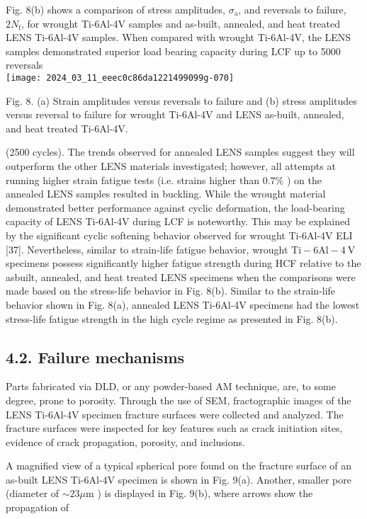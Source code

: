 \documentclass[10pt]{article}
\begin{document}
Fig. 8(b) shows a comparison of stress amplitudes, $\sigma_{\mathrm{a}}$, and reversals to failure, $2 N_{\mathrm{f}}$, for wrought Ti-6Al-4V samples and as-built, annealed, and heat treated LENS Ti-6Al-4V samples. When compared with wrought Ti-6Al-4V, the LENS samples demonstrated superior load bearing capacity during LCF up to 5000 reversals\\
\texttt{[image: 2024\_03\_11\_eeec0c86da1221499099g-070]}

Fig. 8. (a) Strain amplitudes versus reversals to failure and (b) stress amplitudes versus reversal to failure for wrought Ti-6Al-4V and LENS as-built, annealed, and heat treated Ti-6Al-4V.

(2500 cycles). The trends observed for annealed LENS samples suggest they will outperform the other LENS materials investigated; however, all attempts at running higher strain fatigue tests (i.e. strains higher than $0.7 \%$ ) on the annealed LENS samples resulted in buckling. While the wrought material demonstrated better performance against cyclic deformation, the load-bearing capacity of LENS Ti-6Al-4V during LCF is noteworthy. This may be explained by the significant cyclic softening behavior observed for wrought Ti-6Al-4V ELI [37]. Nevertheless, similar to strain-life fatigue behavior, wrought $\mathrm{Ti}-6 \mathrm{Al}-4 \mathrm{~V}$ specimens possess significantly higher fatigue strength during HCF relative to the asbuilt, annealed, and heat treated LENS specimens when the comparisons were made based on the stress-life behavior in Fig. 8(b). Similar to the strain-life behavior shown in Fig. 8(a), annealed LENS Ti-6Al-4V specimens had the lowest stress-life fatigue strength in the high cycle regime as presented in Fig. 8(b).

\subsection*{4.2. Failure mechanisms}
Parts fabricated via DLD, or any powder-based AM technique, are, to some degree, prone to porosity. Through the use of SEM, fractographic images of the LENS Ti-6Al-4V specimen fracture surfaces were collected and analyzed. The fracture surfaces were inspected for key features such as crack initiation sites, evidence of crack propagation, porosity, and inclusions.

A magnified view of a typical spherical pore found on the fracture surface of an as-built LENS Ti-6Al-4V specimen is shown in Fig. 9(a). Another, smaller pore (diameter of $\sim 23 \mu \mathrm{m}$ ) is displayed in Fig. 9(b), where arrows show the propagation of
\end{document}
